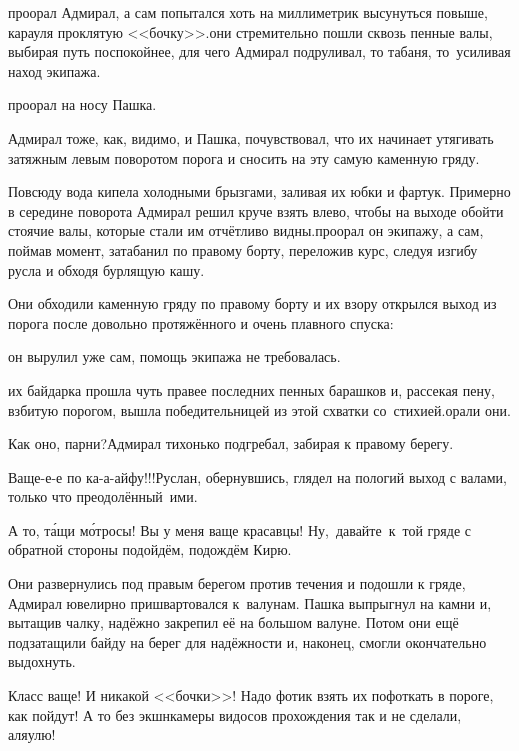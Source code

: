 \mdash проорал Адмирал, а сам попытался хоть на миллиметрик высунуться повыше, карауля проклятую <<бочку>>.\mdash они стремительно пошли сквозь пенные валы, выбирая путь поспокойнее, для чего Адмирал подруливал, то табаня, то~усиливая наход экипажа. 

\mdash проорал на носу Пашка.

\mdash Адмирал тоже, как, видимо, и Пашка, почувствовал, что их начинает утягивать затяжным левым поворотом порога и сносить на эту самую каменную гряду. 

Повсюду вода кипела холодными брызгами, заливая их юбки и фартук. Примерно в середине поворота Адмирал решил круче взять влево, чтобы на выходе обойти стоячие валы, которые стали им отчётливо видны.\mdash проорал он экипажу, а сам, поймав момент, затабанил по правому борту, переложив курс, следуя изгибу русла и обходя бурлящую кашу. 

Они обходили каменную гряду по правому борту и их взору открылся выход из порога после довольно протяжённого и очень плавного спуска: 

\mdash он вырулил уже сам, помощь экипажа не требовалась.

\mdash их байдарка прошла чуть правее последних пенных барашков и, рассекая пену, взбитую порогом, вышла победительницей из этой схватки со~стихией.\mdash орали они.

\diagdash Как оно, парни?\mdash Адмирал тихонько подгребал, забирая к правому берегу.

\diagdash Ваще-е-е по ка-а-айфу!!!\mdash Руслан, обернувшись, глядел на пологий выход с валами, только что преодолённый~ими.

\diagdash А то, т\'{а}щи м\'{о}тросы! Вы у меня ваще красавцы! Ну,~давайте~к~той гряде с обратной стороны подойдём, подождём Кирю.

Они развернулись под правым берегом против течения и подошли к гряде, Адмирал ювелирно пришвартовался к~валунам. Пашка выпрыгнул на камни и, вытащив чалку, надёжно закрепил её на большом валуне. Потом они ещё подзатащили байду на берег для надёжности и, наконец, смогли окончательно выдохнуть.

\diagdash Класс ваще! И никакой <<бочки>>! Надо фотик взять их пофоткать в пороге, как пойдут! А то без экшн\sdash камеры видосов прохождения так и не сделали, аля\sdash улю!

